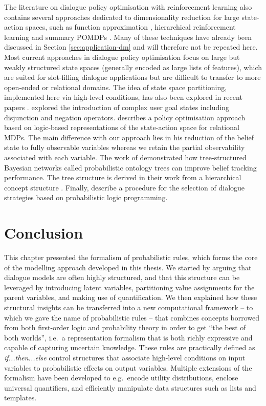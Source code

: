 The literature on dialogue policy optimisation with reinforcement learning also contains several approaches dedicated to dimensionality reduction for large state-action spaces, such as function approximation \citep{Henderson:2008}, hierarchical reinforcement learning \citep{Cuayahuitl:2010} and summary POMDPs \citep{Young:2010}.  Many of these techniques have already been discussed in Section \ref{sec:application-dm} and will therefore not be repeated here. Most current approaches in dialogue policy optimisation focus on large but weakly structured state spaces (generally encoded as large lists of features), which are suited for slot-filling dialogue applications but are difficult to transfer to more open-ended or relational domains.  The idea of state space partitioning, implemented here via high-level conditions, has also been explored in recent papers \citep[see e.g.\ ][]{Williams2010}. \cite{Crook:2010} explored the introduction of complex user goal states including disjunction and negation operators. \cite{Heriberto2011} describes a policy optimisation approach based on logic-based representations of the state-action space for relational MDPs. The main difference with our approach lies in his reduction of the belief state to fully observable variables whereas we retain the partial observability associated with each variable.  The work of \cite{Mehta:2010,Raux2011} demonstrated how tree-structured Bayesian networks called probabilistic ontology trees can improve belief tracking performance.  The tree structure is derived in their work from a hierarchical concept structure .  Finally, \cite{neill2011} describe a procedure for the selection of dialogue strategies based on probabilistic logic programming. 

\section{Conclusion}

This chapter presented the formalism of probabilistic rules, which forms the core of the modelling approach developed in this thesis. We started by arguing that dialogue models are often highly structured, and that this structure can be leveraged by introducing latent variables, partitioning value assignments for the parent variables, and making use of quantification. We then explained how these structural insights can be transferred into a new computational framework -- to which we gave the name of probabilistic rules -- that combines concepts borrowed from both first-order logic and probability theory in order to get ``the best of both worlds'', i.e.\ a representation formalism that is both richly expressive and capable of capturing uncertain knowledge.  These rules are practically defined as \textit{if...then...else} control structures that associate high-level conditions on input variables to probabilistic effects on output variables.  Multiple extensions of the formalism have been developed to e.g.\ encode utility distributions, enclose universal quantifiers, and efficiently manipulate data structures such as lists and templates. 

